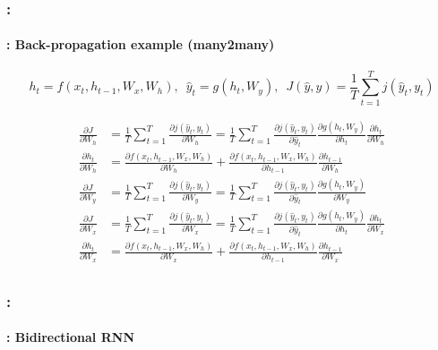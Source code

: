 \documentclass[xcolor=table]{beamer}
\begin{document}
\begin{frame}
	\frametitle{\insertshortsubtitle: \insertsection}
	\framesubtitle{\insertsubsection: Back-propagation example (many2many)}
	
	\[ h_t = f(x_t, h_{t-1}, W_x, W_h),\,\,\, \hat{y}_t = g(h_t, W_y),\,\,\,  J(\hat{y}, y) = \frac{1}{T} \sum_{t=1}^{T} j(\hat{y}_t, y_t)\]
	
	\begin{minipage}{0.6\textwidth}\scriptsize
		\begin{align*}
			\frac{\partial J}{\partial W_h} & = \frac{1}{T} \sum_{t=1}^{T} \frac{\partial j(\hat{y}_t, y_t)}{\partial W_h}
			= \frac{1}{T} \sum_{t=1}^{T} \frac{\partial j(\hat{y}_t, y_t)}{\partial \hat{y}_t} 
			\frac{\partial g(h_t, W_y)}{\partial h_t} 
			\frac{\partial h_t}{\partial W_h} \\
			\frac{\partial h_t}{\partial W_h} & = 
			\frac{\partial f(x_t, h_{t-1}, W_x, W_h)}{\partial W_h} + 
			\frac{\partial f(x_t, h_{t-1}, W_x, W_h)}{\partial h_{t-1}} \frac{\partial h_{t-1}}{\partial W_h} \\
			\frac{\partial J}{\partial W_y} & =
			\frac{1}{T} \sum_{t=1}^{T} \frac{\partial j(\hat{y}_t, y_t)}{\partial W_y}
			= \frac{1}{T} \sum_{t=1}^{T} \frac{\partial j(\hat{y}_t, y_t)}{\partial \hat{y}_t} 
			\frac{\partial g(h_t, W_y)}{\partial W_y} \\
			\frac{\partial J}{\partial W_x} & = 
			\frac{1}{T} \sum_{t=1}^{T} \frac{\partial j(\hat{y}_t, y_t)}{\partial W_x}
			= \frac{1}{T} \sum_{t=1}^{T} \frac{\partial j(\hat{y}_t, y_t)}{\partial \hat{y}_t} 
			\frac{\partial g(h_t, W_y)}{\partial h_t} 
			\frac{\partial h_t}{\partial W_x} \\
			\frac{\partial h_t}{\partial W_x} & = 
			\frac{\partial f(x_t, h_{t-1}, W_x, W_h)}{\partial W_x} + 
			\frac{\partial f(x_t, h_{t-1}, W_x, W_h)}{\partial h_{t-1}} \frac{\partial h_{t-1}}{\partial W_x} \\
		\end{align*}
	\end{minipage}
	\begin{minipage}{0.38\textwidth}
	\end{minipage}
	
\end{frame}

\begin{frame}
	\frametitle{\insertshortsubtitle: \insertsection}
	\framesubtitle{\insertsubsection: Bidirectional RNN}
	
	\begin{center}
	\end{center}
	
\end{frame}
\end{document}
